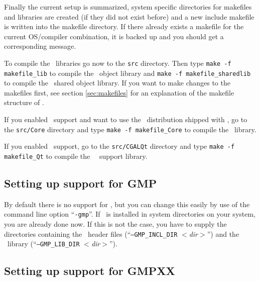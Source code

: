 Finally the current setup is summarized, system specific directories
for makefiles and libraries are created (if they did not exist before)
and a new include makefile is written into the makefile directory. If
there already exists a makefile for the current OS/compiler
combination, it is backed up and you should get a corresponding
message.

To compile the \cgal\ libraries go now to the \texttt{src} directory.
Then type \texttt{make -f makefile\_lib} to compile the \cgal\ object
library and \texttt{make -f makefile\_sharedlib} to compile the \cgal\ 
shared object library. If you want to make changes to the makefiles
first, see section \ref{sec:makefiles} for an explanation of the
makefile structure of \cgal.

If you enabled \core\ support and want to use the \core\ distribution
shipped with \cgal, go to the \texttt{src/Core} directory and type
\texttt{make -f makefile\_Core} to compile the \core\ library.

If you enabled \qt\ support, go to the \texttt{src/CGALQt} directory
and type \texttt{make -f makefile\_Qt} to compile the \cgal\ \qt\ 
support library.


\subsection{Setting up support for GMP}\label{sec:gmp-setup}

By default there is no support for \gmp, but you can change this
easily by use of the command line option ``\texttt{-gmp}''. If \gmp\ is
installed in system directories on your system, you are already done
now. If this is not the case, you have to supply the directories
containing the \gmp\ header files (``\texttt{--GMP\_INCL\_DIR}
\textit{$<$dir$>$}'')\TTindex{GMP\_INCL\_DIR} and the \gmp\ library
(``\texttt{--GMP\_LIB\_DIR}
\textit{$<$dir$>$}'')\TTindex{GMP\_LIB\_DIR}.

\subsection{Setting up support for GMPXX}\label{sec:gmpxx-setup}

